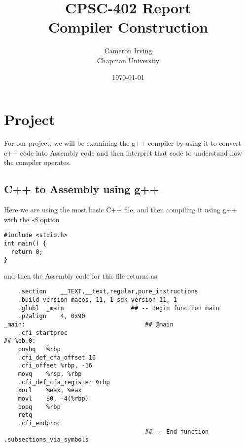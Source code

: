 \documentclass{article}
\title{CPSC-402 Report\\Compiler Construction}
\author{Cameron Irving  \\ Chapman University}
\date{\today}
\begin{document}
\maketitle




\section{Project}
For our project, we will be examining the g++ compiler by using it to convert c++ code into Assembly code and then interpret that code to understand how the compiler operates. 

\subsection{C++ to Assembly using g++}
Here we are using the most basic C++ file, and then compiling it using g++ with the \emph{-S} option\newline

\begin{lstlisting}
#include <stdio.h>
int main() {
  return 0;
}
\end{lstlisting}

and then the Assembly code for this file returns as 

\begin{lstlisting}
	.section	__TEXT,__text,regular,pure_instructions
	.build_version macos, 11, 1	sdk_version 11, 1
	.globl	_main                   ## -- Begin function main
	.p2align	4, 0x90
_main:                                  ## @main
	.cfi_startproc
## %bb.0:
	pushq	%rbp
	.cfi_def_cfa_offset 16
	.cfi_offset %rbp, -16
	movq	%rsp, %rbp
	.cfi_def_cfa_register %rbp
	xorl	%eax, %eax
	movl	$0, -4(%rbp)
	popq	%rbp
	retq
	.cfi_endproc
                                        ## -- End function
.subsections_via_symbols

\end{lstlisting}
\end{document}
